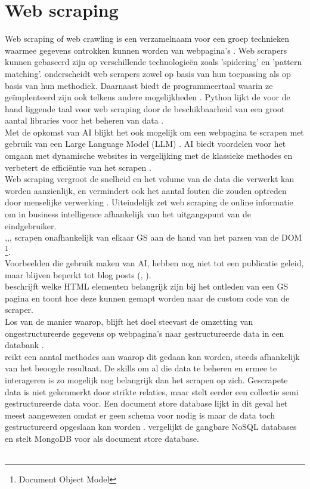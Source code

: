 \section{Web scraping}
Web scraping of web crawling is een verzamelnaam voor een groep technieken waarmee gegevens ontrokken kunnen worden van webpagina's \autocite{Bhatt2023}. Web scrapers kunnen gebaseerd zijn op verschillende technologieën zoals 'spidering' en 'pattern matching'. \textcite{Lotfi2021} onderscheidt web scrapers zowel op basis van hun toepassing als op basis van hun  methodiek. Daarnaast biedt de programmeertaal waarin ze geïmplenteerd zijn ook telkens andere mogelijkheden \autocite{Bhatt2023}.
Python lijkt de voor de hand liggende taal voor web scraping door de beschikbaarheid van een groot aantal libraries voor het beheren van data \autocite{Kumar2023}.\\
Met de opkomst van AI blijkt het ook mogelijk om een webpagina te scrapen met gebruik van een Large Language Model (LLM) \autocite{Ahluwalia2024}. AI biedt voordelen voor het omgaan met dynamische websites in vergelijking met de klassieke methodes en verbetert de efficiëntie van het scrapen \autocite{Ayuso2024}.\\
Web scraping vergroot de snelheid en het volume van de data die verwerkt kan worden aanzienlijk, en vermindert ook het aantal fouten die zouden optreden door menselijke verwerking \autocite{Bhatt2023}. Uiteindelijk zet web scraping de online informatie om in business intelligence afhankelijk van het uitgangspunt van de eindgebruiker.\\
\textcite{Pratiba2018},\textcite{Rafsanjani2022},\textcite{Amin2024},\textcite{Sulistya2024} scrapen onafhankelijk van elkaar GS aan de hand van het parsen van de DOM \footnote{Document Object Model}.\\
Voorbeelden die gebruik maken van AI, hebben nog niet tot een publicatie geleid, maar blijven beperkt tot blog posts (\autocite{Serpapiai2025}, \autocite{Anthropic2025}).\\
\textcite{Yang2017} beschrijft welke HTML elementen belangrijk zijn bij het ontleden van een GS pagina en \textcite{Rahmatulloh2020} toont hoe deze kunnen gemapt worden naar de custom code van de scraper.\\
Los van de manier waarop, blijft het doel steevast de omzetting van ongestructureerde gegevens op webpagina's naar gestructureerde data in een databank \autocite{Singrodia2019}.\\
\textcite{Mitchell2015} reikt een aantal methodes aan waarop dit gedaan kan worden, steeds afhankelijk van het beoogde resultaat. De skills om al die data te beheren en ermee te interageren is zo mogelijk nog belangrijk dan het scrapen op zich. Gescrapete data is niet gekenmerkt door strikte relaties, maar stelt eerder een collectie semi gestructureerde data voor. Een document store database lijkt in dit geval het meest aangewezen omdat er geen schema voor nodig is maar de data toch gestructureerd opgeslaan kan worden \autocite{Meier2019}. \textcite{Lourenco2015} vergelijkt de gangbare NoSQL databases en stelt MongoDB voor als document store database.\\\\
